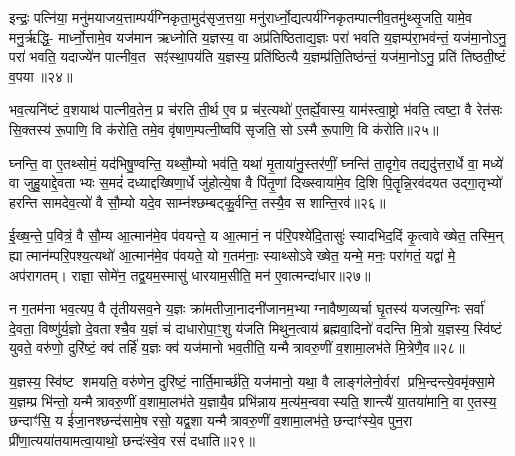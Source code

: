 {\anuvakamend[{रेतो॒ यज॑माने दधाति लो॒क ऐ॒न्द्र स॒प्तत्रिꣳ॑शच्च॥५॥}]}

इन्द्रः॒ पत्नि॑या॒ मनु॑मयाजय॒त्ताम्पर्य॑ग्निकृता॒मुद॑सृज॒त्तया॒ मनु॑रार्ध्नो॒द्यत्पर्य॑ग्निकृतम्पात्नीव॒तमु॑थ्सृ॒जति॒ यामे॒व मनु॒र्\mbox{}ऋद्धि॒- मार्ध्नो॒त्तामे॒व यज॑मान ऋध्नोति य॒ज्ञस्य॒ वा अप्र॑तिष्ठिताद्य॒ज्ञः परा॑ भवति य॒ज्ञम्प॑रा॒भव॑न्तं॒ यज॑मा॒नोऽनु॒ परा॑ भवति॒ यदाज्ये॑न पात्नीव॒त सꣵ॑स्था॒पय॑ति य॒ज्ञस्य॒ प्रति॑ष्ठित्यै य॒ज्ञम्प्र॑ति॒तिष्ठ॑न्तं॒ यज॑मा॒नोऽनु॒ प्रति॑ तिष्ठती॒ष्टं व॒पया॥२४॥

भव॒त्यनि॑ष्टं व॒शयाथ॑ पात्नीव॒तेन॒ प्र च॑रति ती॒र्थ ए॒व प्र च॑र॒त्यथो॑ ए॒तर्\mbox{}ह्ये॒वास्य॒ याम॑स्त्वा॒ष्ट्रो भ॑वति॒ त्वष्टा॒ वै रेत॑सः सि॒क्तस्य॑ रू॒पाणि॒ वि क॑रोति॒ तमे॒व वृ॑षाण॒म्पत्नी॒ष्वपि॑ सृजति॒ सोऽस्मै रू॒पाणि॒ वि क॑रोति॥२५॥

{\anuvakamend[{व॒पया॒ षट्त्रिꣳ॑शच्च॥६॥}]}

घ्नन्ति॒ वा ए॒तथ्सोमं॒ यद॑भिषु॒ण्वन्ति॒ यथ्सौ॒म्यो भव॑ति॒ यथा॑ मृ॒ताया॑नु॒स्तर॑णीं॒ घ्नन्ति॑ ता॒दृगे॒व तद्यदु॑त्तरा॒र्धे वा॒ मध्ये॑ वा जुहु॒याद्दे॒वताभ्यः स॒मदं॑ दध्याद्दख्षिणा॒र्धे जु॑होत्ये॒षा वै पि॑तृ॒णां दिख्स्वाया॑मे॒व दि॒शि पि॒तॄन्नि॒रव॑दयत उद्गा॒तृभ्यो॑ हरन्ति सामदेव॒त्यो॑ वै सौ॒म्यो यदे॒व साम्न॑श्छम्बट्कु॒र्वन्ति॒ तस्यै॒व स शान्ति॒रव॑॥२६॥

ई॒ख्ष॒न्ते॒ प॒वित्रं॒ वै सौ॒म्य आ॒त्मान॑मे॒व प॑वयन्ते॒ य आ॒त्मानं॒ न प॑रि॒पश्ये॑दि॒तासुः॑ स्यादभिद॒दिं कृ॒त्वावेख्षेत॒ तस्मि॒न् ह्यात्मान॑म्परि॒पश्य॒त्यथो॑ आ॒त्मान॑मे॒व प॑वयते॒ यो ग॒तम॑नाः॒ स्याथ्सोऽवेख्षेत॒ यन्मे॒ मनः॒ परा॑गतं॒ यद्वा॑ मे॒ अप॑रागतम्। राज्ञा॒ सोमे॑न॒ तद्व॒यम॒स्मासु॑ धारयाम॒सीति॒ मन॑ ए॒वात्मन्दा॑धार॥२७॥

न ग॒तम॑ना भव॒त्यप॒ वै तृ॑तीयसव॒ने य॒ज्ञः क्रा॑मतीजा॒नादनी॑जानम॒भ्याग्नावैष्ण॒व्यर्चा घृ॒तस्य॑ यजत्य॒ग्निः सर्वा॑ दे॒वता॒ विष्णु॑र्य॒ज्ञो दे॒वताश्चै॒व य॒ज्ञं च॑ दाधारोपा॒ꣳ॒शु य॑जति मिथुन॒त्वाय॑ ब्रह्मवा॒दिनो॑ वदन्ति मि॒त्रो य॒ज्ञस्य॒ स्वि॑ष्टं युवते॒ वरु॑णो॒ दुरि॑ष्टं॒ क्व॑ तर्\mbox{}हि॑ य॒ज्ञः क्व॑ यज॑मानो भव॒तीति॒ यन्मैत्रावरु॒णीं व॒शामा॒लभ॑ते मि॒त्रेणै॒व॥२८॥

य॒ज्ञस्य॒ स्वि॑ष्ट शमयति॒ वरु॑णेन॒ दुरि॑ष्टं॒ नार्ति॒मार्च्छ॑ति॒ यज॑मानो॒ यथा॒ वै लाङ्ग॑लेनो॒र्वरां प्रभि॒न्दन्त्ये॒वमृ॑क्सा॒मे य॒ज्ञम्प्र भि॑न्तो॒ यन्मैत्रावरु॒णीं व॒शामा॒लभ॑ते य॒ज्ञायै॒व प्रभि॑न्नाय म॒त्य॑म॒न्ववास्यति॒ शान्त्यै॑ या॒तया॑मानि॒ वा ए॒तस्य॒ छन्दाꣳ॑सि॒ य ई॑जा॒नश्छन्द॑सामे॒ष रसो॒ यद्व॒शा यन्मैत्रावरु॒णीं व॒शामा॒लभ॑ते॒ छन्दाꣳ॑स्ये॒व पुन॒रा प्री॑णा॒त्यया॑तयामत्वा॒याथो॒ छन्दः॑स्वे॒व रसं॑ दधाति॥२९॥

